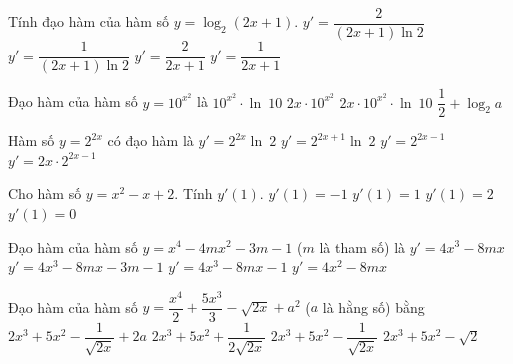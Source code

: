 \begin{ex}%
	Tính đạo hàm của hàm số $y=\log_2  (2x+1)$.
	 \choice
		{\True  $y'=\dfrac{2}{(2x+1)\ln 2}$}
		{$y'=\dfrac{1}{(2x+1)\ln  2}$}
		{$y'=\dfrac{2}{2x+1}$} 
		{$y'=\dfrac{1}{2x+1}$} 
\end{ex}

\begin{ex}%
	Đạo hàm của hàm  số $y=10^{x^{2}}$ là
	 \choice
		 {$10^{x^{2}} \cdot \ln~10$}
		 {$2x \cdot 10^{x^{2}}$}
		{\True $2x \cdot  10^{x^{2}} \cdot \ln~10$}
		{$\dfrac{1}{2}+\log_{2}a$} 
\end{ex}

\begin{ex}%
	Hàm số  $y=2^{2x}$ có đạo hàm là
	\choice 
		{$y'=2^{2x}\ln~2$} 
		{\True  $y'=2^{2x+1}\ln~2$}
		{$y'=2^{2x-1}$} 
		{$y'=2x \cdot  2^{2x-1}$}
\end{ex}

\begin{ex}%
	 Cho hàm số $y=x^2-x+2$. Tính $y'(1)$.
	 \choice
		 {$y'(1)=-1$}
		{\True  $y'(1)=1$}
		{$y'(1)=2$} 
		 {$y'(1)=0$}
\end{ex}

\begin{ex}%
	Đạo hàm của hàm số  $y=x^4-4mx^2-3m-1$ ($m$ là tham số) là
	\choice 
		 {\True $y'=4x^3-8mx$}
		{$y'=4x^3-8mx-3m-1$} 
		{$y'=4x^3-8mx-1$} 
		{$y'=4x^2-8mx$} 
\end{ex}

\begin{ex}%
	Đạo hàm của hàm số $y=\dfrac{x^4}{2}+\dfrac{5x^3}{3}-\sqrt{2x}+a^2$ ($a$ là  hằng số) bằng
	\choice 
		{$2x^3+5x^2-\dfrac{1}{\sqrt{2x}}+2a$} 
		{$2x^3+5x^2+\dfrac{1}{2\sqrt{2x}}$} 
		 {\True $2x^3+5x^2-\dfrac{1}{\sqrt{2x}}$}
		 {$2x^3+5x^2-\sqrt{2}$}
\end{ex}

